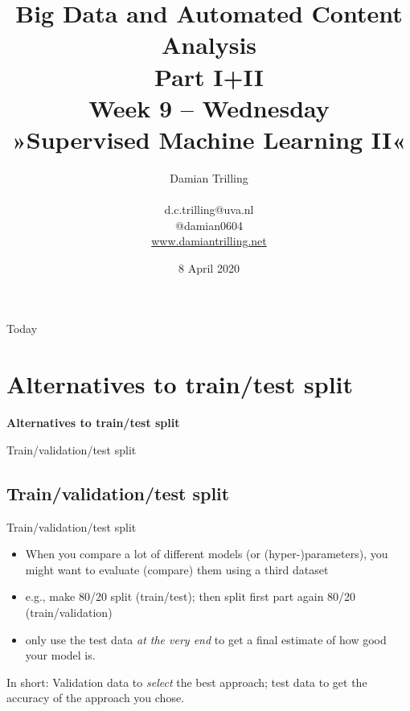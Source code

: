 \documentclass{beamer}
\begin{document}
\title[Big Data and Automated Content Analysis]{\textbf{Big Data and Automated Content Analysis\\ Part I+II} \\ Week 9 -- Wednesday \\ »Supervised Machine Learning II«}
\author[Damian Trilling]{Damian Trilling \\ ~ \\ \footnotesize{d.c.trilling@uva.nl \\@damian0604} \\ \url{www.damiantrilling.net}}
\date{8 April 2020}


\begin{frame}{}
\titlepage
\end{frame}

\begin{frame}{Today}
\tableofcontents
\end{frame}






\section{Alternatives to train/test split}

\begin{frame}[plain]
\textbf{Alternatives to train/test split}

Train/validation/test split 
\end{frame}


\subsection{Train/validation/test split}

\begin{frame}{Train/validation/test split}
\begin{itemize}
	\item When you compare a lot of different models (or (hyper-)parameters), you might want to evaluate (compare) them using a third dataset 
	\item e.g., make 80/20 split (train/test); then split first part again 80/20 (train/validation)
	\item only use the test data \emph{at the very end} to get a final estimate of how good your model is.
\end{itemize}
\pause
In short: Validation data to \emph{select} the best approach; test data to get the accuracy of the approach you chose.
\end{frame}
\end{document}
